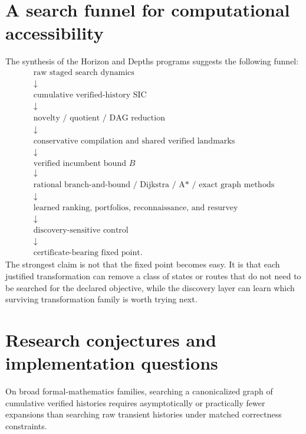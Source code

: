 \section{A search funnel for computational accessibility}
The synthesis of the Horizon and Depths programs suggests the following funnel:
\[
\begin{array}{c}
\text{raw staged search dynamics}\\[2pt]
\downarrow\\[2pt]
\text{cumulative verified-history SIC}\\[2pt]
\downarrow\\[2pt]
\text{novelty / quotient / DAG reduction}\\[2pt]
\downarrow\\[2pt]
\text{conservative compilation and shared verified landmarks}\\[2pt]
\downarrow\\[2pt]
\text{verified incumbent bound }B\\[2pt]
\downarrow\\[2pt]
\text{rational branch-and-bound / Dijkstra / A* / exact graph methods}\\[2pt]
\downarrow\\[2pt]
\text{learned ranking, portfolios, reconnaissance, and resurvey}\\[2pt]
\downarrow\\[2pt]
\text{discovery-sensitive control}\\[2pt]
\downarrow\\[2pt]
\text{certificate-bearing fixed point.}
\end{array}
\]
The strongest claim is not that the fixed point becomes easy. It is that each justified transformation can remove a class of states or routes that do not need to be searched for the declared objective, while the discovery layer can learn which surviving transformation family is worth trying next.

\section{Research conjectures and implementation questions}
\begin{conjecture}
On broad formal-mathematics families, searching a canonicalized graph of cumulative verified histories requires asymptotically or practically fewer expansions than searching raw transient histories under matched correctness constraints.
\end{conjecture}

